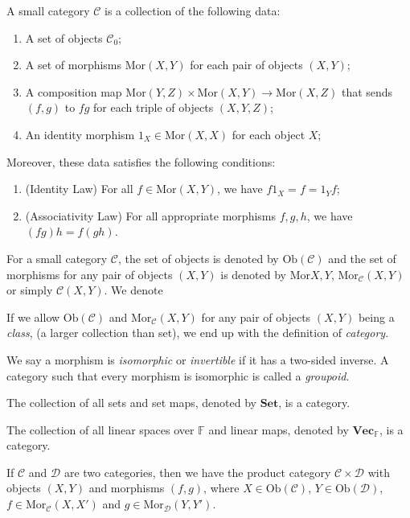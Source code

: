 \documentclass[
	11pt, %
	fleqn, %
	a4paper, %
]{LegrandOrangeBook}
\newcommand{\F}{\mathbb{F}} %
\newcommand{\C}{\mathcal{C}} %
\newcommand{\Set}{\textbf{Set}} %
\newcommand{\Vect}{\textbf{Vec}} %
\newcommand{\Mor}{\text{Mor}} %
\newcommand{\Ob}[1]{\text{Ob}(#1)} %
\begin{document}
\begin{definition}
    A small category $\C$ is a collection of the following data:
    \begin{enumerate}
        \item A set of objects $\C_0$;
        \item A set of morphisms $\Mor(X, Y)$ for each pair of objects $(X, Y)$;
        \item A composition map $\Mor(Y, Z) \times \Mor(X, Y) \to \Mor(X, Z)$ that sends $(f, g)$ to $fg$ for each triple of objects $(X, Y, Z)$;
        \item An identity morphism $1_X \in \Mor(X, X)$ for each object $X$;
    \end{enumerate}
    Moreover, these data satisfies the following conditions:
    \begin{enumerate}[label=(\alph*)]
        \item (Identity Law) For all $f \in \Mor(X, Y)$, we have $f 1_X = f = 1_Y f$;
        \item (Associativity Law) For all appropriate morphisms $f, g, h$, we have $(fg)h = f(gh)$.
    \end{enumerate}
\end{definition}

For a small category $\C$, the set of objects is denoted by $\Ob{\C}$ and the set of morphisms for any pair of objects $(X, Y)$ is denoted by $\Mor{X, Y}$, $\Mor_{\C} (X, Y)$ or simply $\C(X, Y)$. We denote 

If we allow $\Ob{\C}$ and $\Mor_{\C}(X, Y)$ for any pair of objects $(X, Y)$ being a \emph{class}, (a larger collection than set), we end up with the definition of \emph{category}.

We say a morphism is \emph{isomorphic} or \emph{invertible} if it has a two-sided inverse. A category such that every morphism is isomorphic is called a \emph{groupoid}.

\begin{example}
    The collection of all sets and set maps, denoted by $\Set$, is a category.
\end{example}

\begin{example}
    The collection of all linear spaces over $\F$ and linear maps, denoted by $\Vect_{\F}$, is a category.
\end{example}

\begin{example}
    If $\C$ and $\mathcal{D}$ are two categories, then we have the product category $\C \times \mathcal{D}$ with objects $(X, Y)$ and morphisms $(f, g)$, where $X \in \Ob{\C}$, $Y \in \Ob{\mathcal{D}}$, $f \in \Mor_{\C}(X, X')$ and $g \in \Mor_{\mathcal{D}}(Y, Y')$.
\end{example}
\end{document}
